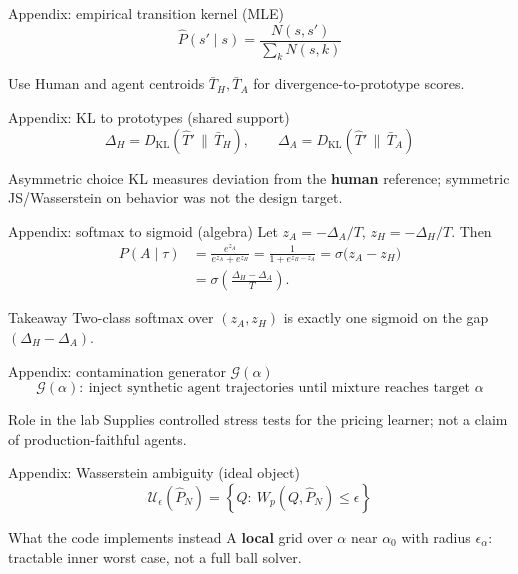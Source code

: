 \begin{frame}{Appendix: empirical transition kernel (MLE)}
  \[
    \hat{P}(s'\mid s)=\frac{N(s,s')}{\sum_k N(s,k)}
  \]
  \begin{block}{Use}
    Human and agent centroids \(\bar{T}_H,\bar{T}_A\) for divergence-to-prototype scores.
  \end{block}
\end{frame}

\begin{frame}{Appendix: KL to prototypes (shared support)}
  \[
    \Delta_H = D_{\mathrm{KL}}(\hat{T}'\,\|\,\bar{T}_H),\qquad
    \Delta_A = D_{\mathrm{KL}}(\hat{T}'\,\|\,\bar{T}_A)
  \]
  \begin{exampleblock}{Asymmetric choice}
    KL measures deviation from the \textbf{human} reference; symmetric JS/Wasserstein on behavior was not the design target.
  \end{exampleblock}
\end{frame}

\begin{frame}{Appendix: softmax to sigmoid (algebra)}
  \small
  Let \(z_A=-\Delta_A/T\), \(z_H=-\Delta_H/T\). Then
  \begin{align*}
    P(A\mid\tau) &= \frac{e^{z_A}}{e^{z_A}+e^{z_H}}
    = \frac{1}{1+e^{z_H-z_A}}
    = \sigma\bigl(z_A-z_H\bigr) \\
    &= \sigma\!\left(\frac{\Delta_H-\Delta_A}{T}\right).
  \end{align*}
  \begin{block}{Takeaway}
    Two-class softmax over \((z_A,z_H)\) is exactly one sigmoid on the gap \((\Delta_H-\Delta_A)\).
  \end{block}
\end{frame}

\begin{frame}{Appendix: contamination generator \(\mathcal{G}(\alpha)\)}
  \[
    \mathcal{G}(\alpha):\ \text{inject synthetic agent trajectories until mixture reaches target }\alpha
  \]
  \begin{alertblock}{Role in the lab}
    Supplies controlled stress tests for the pricing learner; not a claim of production-faithful agents.
  \end{alertblock}
\end{frame}


\begin{frame}{Appendix: Wasserstein ambiguity (ideal object)}
  \[
    \mathcal{U}_\epsilon(\hat{P}_N)=\left\{ Q:\ W_p(Q,\hat{P}_N)\le \epsilon \right\}
  \]
  \begin{block}{What the code implements instead}
    A \textbf{local} grid over \(\alpha\) near \(\alpha_0\) with radius \(\epsilon_\alpha\): tractable inner worst case, not a full ball solver.
  \end{block}
\end{frame}

